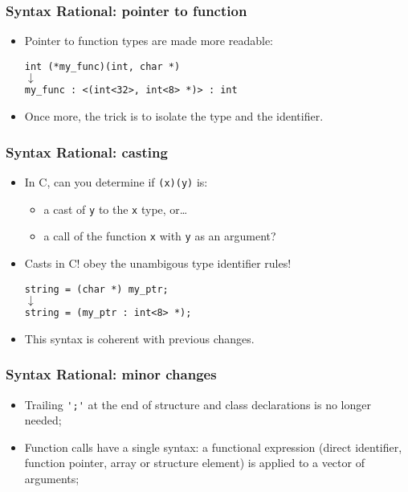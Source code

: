 \documentclass[pdftex]{beamer}
\begin{document}
\begin{frame}[fragile]
  \frametitle{Syntax Rational: pointer to function}

  \begin{itemize}
  \item Pointer to function types are made more readable:
    \begin{center}\scriptsize
      \verb#int (*my_func)(int, char *)# \\
      \hspace{0.3cm}$\downarrow$\hspace{0.3cm} \\
      \verb#my_func : <(int<32>, int<8> *)> : int#
    \end{center}
  \item Once more, the trick is to isolate the type and the identifier.
  \end{itemize}
\end{frame}

\begin{frame}[fragile]
  \frametitle{Syntax Rational: casting}

  \begin{itemize}
  \item In C, can you determine if \verb#(x)(y)# is:
    \begin{itemize}
      \item a cast of \texttt{y} to the \texttt{x} type, or…
      \item a call of the function \texttt{x} with \texttt{y} as an argument?
    \end{itemize}
  \item Casts in C! obey the unambigous type identifier rules!
    \begin{center}\scriptsize
      \verb#string = (char *) my_ptr;# \\
      \hspace{0.3cm}$\downarrow$\hspace{0.3cm} \\
      \verb#string = (my_ptr : int<8> *);#
    \end{center}
  \item This syntax is coherent with previous changes.
  \end{itemize}
\end{frame}

\begin{frame}[fragile]
  \frametitle{Syntax Rational: minor changes}

  \begin{itemize}
  \item Trailing \verb|';'| at the end of structure and class declarations is
    no longer needed;
  \item Function calls have a single syntax: a functional expression
    (direct identifier, function pointer, array or structure element)
    is applied to a vector of arguments;
  \end{itemize}
\end{frame}
\end{document}
